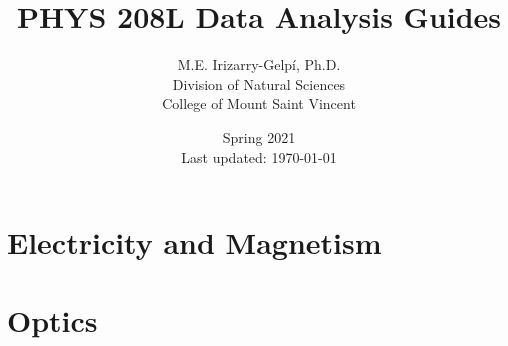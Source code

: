 \documentclass[letterpaper,11pt]{report}
\begin{document}
%
\title{\Huge{PHYS 208L Data Analysis Guides}}
\author{M.E. Irizarry-Gelp\'{i}, Ph.D. \\ Division of Natural Sciences \\ College of Mount Saint Vincent}
\date{Spring 2021 \\ Last updated: \today{ }\currenttime}
%
\maketitle
\tableofcontents
%


%
\part{Electricity and Magnetism}
%




% 


%
\part{Optics}






%
\end{document}
